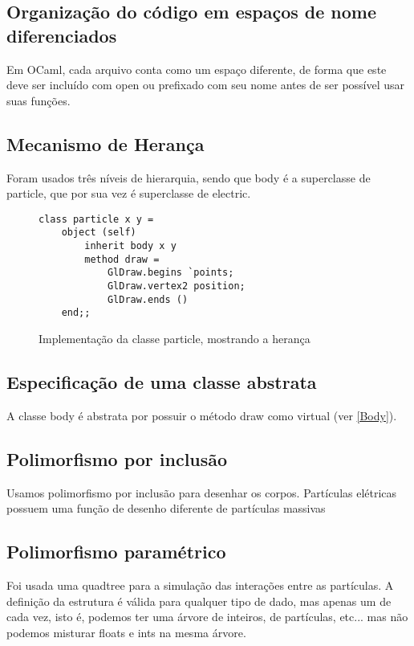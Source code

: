 \documentclass[a4paper,10pt]{article}
\begin{document}
\subsection{Organização do código em espaços de nome diferenciados}
	Em OCaml, cada arquivo conta como um espaço diferente, de forma que este deve ser incluído com open ou prefixado com seu nome antes de ser possível usar suas funções.
	
\subsection{Mecanismo de Herança}
	Foram usados três níveis de hierarquia, sendo que body é a superclasse de particle, que por sua vez é superclasse de electric.

	\begin{figure}[H]
	\centering	
	\begin{lstlisting}
class particle x y =
	object (self)
		inherit body x y
		method draw =
			GlDraw.begins `points;
			GlDraw.vertex2 position;
			GlDraw.ends ()
	end;;
	\end{lstlisting}
	\caption{Implementação da classe particle, mostrando a herança}
\end{figure}

\subsection{Especificação de uma classe abstrata}
	A classe body é abstrata por possuir o método draw como virtual (ver \autoref{Body}).

\subsection{Polimorfismo por inclusão}
	
	Usamos polimorfismo por inclusão para desenhar os corpos. Partículas elétricas possuem uma função de desenho diferente de partículas massivas
	
\subsection{Polimorfismo paramétrico}
	
		Foi usada uma quadtree para a simulação das interações entre as partículas. A definição da estrutura é válida para qualquer tipo de dado, mas apenas um de cada vez, isto é, podemos ter uma árvore de inteiros, de partículas, etc... mas não podemos misturar floats e ints na mesma árvore.
		
\end{document}
